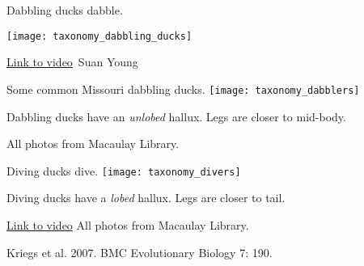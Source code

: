 \documentclass[t]{beamer}
\newcommand\sshighlight[1]{%
	\highlight{\shortstack[l]{#1}}%
}
\begin{document}
\begin{frame}[t]{Dabbling ducks dabble.}
\vspace{-0.5\baselineskip}

\centering
\texttt{[image: taxonomy\_dabbling\_ducks]}


\vfilll
\tiny \href{https://www.youtube.com/watch?v=UaW66BVuZgM}{Link to video} \hfill \textcopyright\,Suan Young
\end{frame}


\begin{frame}{Some common Missouri dabbling ducks.}
\texttt{[image: taxonomy\_dabblers]}

Dabbling ducks have an \textit{unlobed} hallux. Legs are closer to mid-body.

\vfilll

\tinyfill All photos from Macaulay Library.
\end{frame}


\begin{frame}{Diving ducks dive.}
\texttt{[image: taxonomy\_divers]}



Diving ducks have a \textit{lobed} hallux. Legs are closer to tail.

\vfilll

\tiny \href{https://www.youtube.com/watch?v=ncNBfmVMCkI}{Link to video} \hfill All photos from Macaulay Library.
\end{frame}


{
\begin{frame}[b,plain]
	\tiny Kriegs et al. 2007. BMC Evolutionary Biology 7: 190.
\end{frame}
}

%
%
%
%
\end{document}
